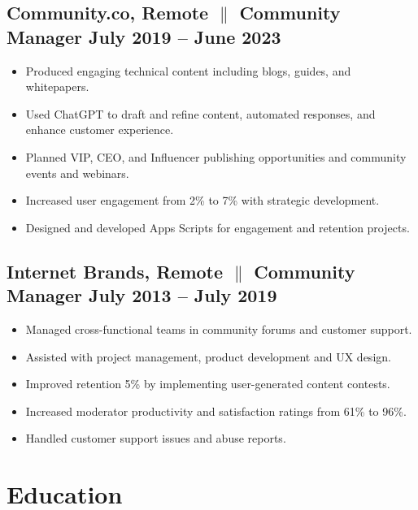 \documentclass[a4paper,9pt]{article}
\begin{document}
\subsection{Community.co, Remote {$\parallel$}{ Community Manager} \hfill
      \textbf{July 2019 – June
            2023}}
\begin{itemize}
      \item Produced engaging technical content including blogs, guides, and whitepapers.
      \item Used ChatGPT to draft and refine content, automated responses, and enhance customer experience.
      \item Planned VIP, CEO, and Influencer publishing opportunities and community
            events and webinars.
      \item Increased user engagement from 2\% to 7\% with
            strategic
            development.
      \item Designed and developed Apps Scripts for engagement and retention
            projects.
\end{itemize}

\subsection{Internet Brands, Remote {$\parallel$}{ Community Manager} \hfill
      \textbf{July 2013 – July
            2019}}
\begin{itemize}
      \item Managed cross-functional teams in community forums and customer
            support.
      \item Assisted with project management, product development and UX design.
      \item Improved retention 5\% by implementing user-generated content contests.
      \item Increased moderator productivity and satisfaction ratings from 61\%
            to
            96\%.
      \item Handled customer support issues and abuse reports.
\end{itemize}

\section{Education}
\end{document}
